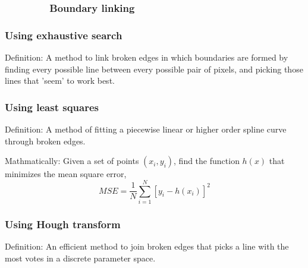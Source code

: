 \subsubsection{\ \ \ \ \ \ \ \ Boundary linking}
\begin{frame}
\frametitle{Using exhaustive search}
\logoCSIPCPL\mypagenum
	\begin{block}{Definition:}
	A method to link broken edges in which boundaries are formed by finding every possible line between every possible pair of pixels, and picking those lines that 'seem' to work best.
	\end{block}
\end{frame}





\begin{frame}
\frametitle{Using least squares}
\logoCSIPCPL\mypagenum
	\begin{block}{Definition:}
		A method of fitting a piecewise linear or higher order spline curve through broken edges.
	\end{block}
	\begin{block}{Mathmatically:} 
		Given a set of points $(x_i, y_i)$, find the function $h(x)$ that minimizes the mean square error,
		\begin{equation}
			MSE = \frac{1}{N} \sum_{i=1}^{N} [y_i - h(x_i)]^2
		\end{equation}
	\end{block}
\end{frame}




\begin{frame}
\frametitle{Using Hough transform}
\logoCSIPCPL\mypagenum
	\begin{block}{Definition:}
		An efficient method to join broken edges that picks a line with the most votes in a discrete parameter space.
	\end{block}
\end{frame}



